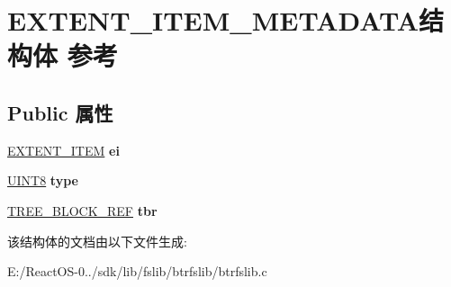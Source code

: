 \hypertarget{struct_e_x_t_e_n_t___i_t_e_m___m_e_t_a_d_a_t_a}{}\section{E\+X\+T\+E\+N\+T\+\_\+\+I\+T\+E\+M\+\_\+\+M\+E\+T\+A\+D\+A\+T\+A结构体 参考}
\label{struct_e_x_t_e_n_t___i_t_e_m___m_e_t_a_d_a_t_a}
\subsection*{Public 属性}
\begin{DoxyCompactItemize}
\item 
\mbox{\label{struct_e_x_t_e_n_t___i_t_e_m___m_e_t_a_d_a_t_a_abb63a8edb20a4768a060cfe83a880f88}} 
\hyperlink{struct_e_x_t_e_n_t___i_t_e_m}{E\+X\+T\+E\+N\+T\+\_\+\+I\+T\+EM} {\bfseries ei}
\item 
\mbox{\label{struct_e_x_t_e_n_t___i_t_e_m___m_e_t_a_d_a_t_a_a6493af2f1be7316f029328eb5fac8674}} 
\hyperlink{_processor_bind_8h_ab27e9918b538ce9d8ca692479b375b6a}{U\+I\+N\+T8} {\bfseries type}
\item 
\mbox{\label{struct_e_x_t_e_n_t___i_t_e_m___m_e_t_a_d_a_t_a_a1b3821626cc3d40a70f64da11668b71f}} 
\hyperlink{struct_t_r_e_e___b_l_o_c_k___r_e_f}{T\+R\+E\+E\+\_\+\+B\+L\+O\+C\+K\+\_\+\+R\+EF} {\bfseries tbr}
\end{DoxyCompactItemize}


该结构体的文档由以下文件生成\+:\begin{DoxyCompactItemize}
\item 
E\+:/\+React\+O\+S-\/0../sdk/lib/fslib/btrfslib/btrfslib.\+c\end{DoxyCompactItemize}
